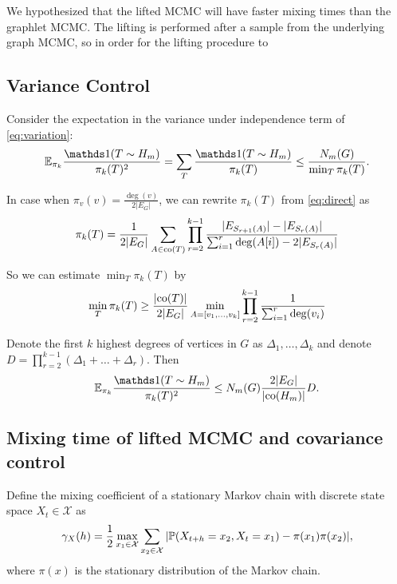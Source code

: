 We hypothesized that the lifted MCMC will have faster mixing times than the graphlet MCMC.
The lifting is performed after a sample from the underlying graph MCMC, so in order for the lifting procedure to 


\subsection{Variance Control}
Consider the expectation in the variance under independence term of \eqref{eq:variation}:
\begin{equation}
    \E_{\pi_k} \frac{\ind(T\sim H_m)}{\pi_k(T)^2} = \sum_T \frac{\ind(T\sim H_m)}{\pi_k(T)} \leq \frac{N_m(G)}{\min_T \pi_k(T)}.
\end{equation}

In case when $\pi_v(v) = \frac{\deg(v)}{2|E_G|}$, we can rewrite $\pi_k(T)$ from \eqref{eq:direct} as
\begin{equation*}
    \pi_k(T) = \frac{1}{2|E_G|} \sum_{A\in\co(T)} \prod_{r=2}^{k-1} \frac{|E_{S_{r+1}(A)}| - |E_{S_r(A)}|}{\sum_{i=1}^r \deg(A[i]) - 2|E_{S_r(A)}|}
\end{equation*}

So we can estimate $\min_T \pi_k(T)$ by
\begin{equation*}
    \min_T \pi_k(T) \geq \frac{|\co(T)|}{2|E_G|} \min_{A = [v_1,\ldots, v_k]} \prod_{r=2}^{k-1} \frac{1}{\sum_{i=1}^r \deg(v_i)}
\end{equation*}

Denote the first $k$ highest degrees of vertices in $G$ as $\Delta_1,\ldots, \Delta_k$ and denote $D = \prod_{r=2}^{k-1} (\Delta_1 +\ldots + \Delta_r)$. Then
\begin{equation}
    \E_{\pi_k} \frac{\ind(T\sim H_m)}{\pi_k(T)^2} \leq N_m(G) \frac{2|E_G|}{|\co(H_m)|} D.
\end{equation}

\subsection{Mixing time of lifted MCMC and covariance control}

\begin{definition}
  Define the mixing coefficient of a stationary Markov chain with discrete state space $X_t \in \mathcal X$ as
  \begin{equation}
      \gamma_X(h) = \frac{1}{2}\max_{x_1\in \mathcal X} \sum_{x_2 \in \mathcal X} |\P(X_{t+h} = x_2, X_t = x_1) - \pi(x_1) \pi(x_2)|,
  \end{equation}
  where $\pi(x)$ is the stationary distribution of the Markov chain.
\end{definition}

